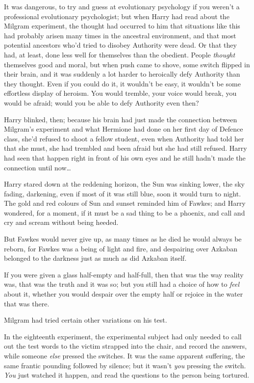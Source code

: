 It was dangerous, to try and guess at evolutionary psychology if you
weren't a professional evolutionary psychologist; but when Harry had
read about the Milgram experiment, the thought had occurred to him that
situations like this had probably arisen many times in the ancestral
environment, and that most potential ancestors who'd tried to disobey
Authority were dead. Or that they had, at least, done less well for
themselves than the obedient. People \emph{thought} themselves good and
moral, but when push came to shove, some switch flipped in their brain,
and it was suddenly a lot harder to heroically defy Authority than they
thought. Even if you could do it, it wouldn't be easy, it wouldn't be
some effortless display of heroism. You would tremble, your voice would
break, you would be afraid; would you be able to defy Authority even
then?

Harry blinked, then; because his brain had just made the connection
between Milgram's experiment and what Hermione had done on her first day
of Defence class, she'd refused to shoot a fellow student, even when
Authority had told her that she must, she had trembled and been afraid
but she had still refused. Harry had seen that happen right in front of
his own eyes and he still hadn't made the connection until now\ldots{}

Harry stared down at the reddening horizon, the Sun was sinking lower,
the sky fading, darkening, even if most of it was still blue, soon it
would turn to night. The gold and red colours of Sun and sunset reminded
him of Fawkes; and Harry wondered, for a moment, if it must be a sad
thing to be a phoenix, and call and cry and scream without being heeded.

But Fawkes would never give up, as many times as he died he would always
be reborn, for Fawkes was a being of light and fire, and despairing over
Azkaban belonged to the darkness just as much as did Azkaban itself.

If you were given a glass half-empty and half-full, then that was the
way reality was, that was the truth and it was so; but you still had a
choice of how to \emph{feel} about it, whether you would despair over
the empty half or rejoice in the water that was there.

Milgram had tried certain other variations on his test.

In the eighteenth experiment, the experimental subject had only needed
to call out the test words to the victim strapped into the chair, and
record the answers, while someone \emph{else} pressed the switches. It
was the same apparent suffering, the same frantic pounding followed by
silence; but it wasn't \emph{you} pressing the switch. \emph{You} just
watched it happen, and read the questions to the person being tortured.


